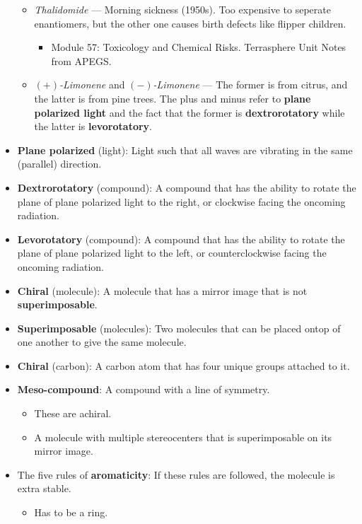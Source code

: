 \documentclass[titlepage]{article}
\numberwithin{figure}{section}
\numberwithin{table}{section}
\numberwithin{equation}{section}
\begin{document}
\begin{itemize}
\begin{itemize}
        \item \textit{Thalidomide} --- Morning sickness (1950s). Too expensive to seperate enantiomers, but the other one causes birth defects like flipper children.
        \begin{itemize}
            \item Module 57: Toxicology and Chemical Risks. Terrasphere Unit Notes from APEGS.
        \end{itemize}
        \item \textit{$(+)$-Limonene} and \textit{$(-)$-Limonene} --- The former is from citrus, and the latter is from pine trees. The plus and minus refer to \textbf{plane polarized light} and the fact that the former is \textbf{dextrorotatory} while the latter is \textbf{levorotatory}.
    \end{itemize}
    \item \textbf{Plane polarized} (light): Light such that all waves are vibrating in the same (parallel) direction.
    \item \textbf{Dextrorotatory} (compound): A compound that has the ability to rotate the plane of plane polarized light to the right, or clockwise facing the oncoming radiation.
    \item \textbf{Levorotatory} (compound): A compound that has the ability to rotate the plane of plane polarized light to the left, or counterclockwise facing the oncoming radiation.
    \item \textbf{Chiral} (molecule): A molecule that has a mirror image that is not \textbf{superimposable}.
    \item \textbf{Superimposable} (molecules): Two molecules that can be placed ontop of one another to give the same molecule.
    \item \textbf{Chiral} (carbon): A carbon atom that has four unique groups attached to it.
    \item \textbf{Meso-compound}: A compound with a line of symmetry.
    \begin{itemize}
        \item These are achiral.
        \item A molecule with multiple stereocenters that is superimposable on its mirror image.
    \end{itemize}
    \item The five rules of \textbf{aromaticity}: If these rules are followed, the molecule is extra stable.
    \begin{itemize}
        \item Has to be a ring.

\end{itemize}
\end{itemize}
\end{document}
